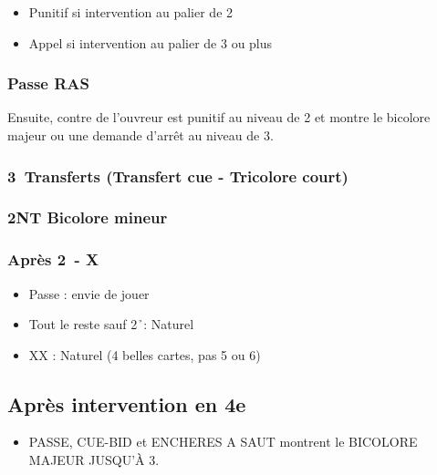\documentclass[a4paper]{article}
\begin{document}
\begin{itemize}
\item Punitif si intervention au palier de 2

\item Appel si intervention au palier de 3 ou plus

\end{itemize}

\subsubsection{Passe RAS}

Ensuite, contre de l'ouvreur est punitif au niveau de 2 et montre le bicolore majeur ou une demande d'arrêt au niveau de 3.

\subsubsection{3\pdfc\pdfd\pdfh\pdfs\ Transferts (Transfert cue - Tricolore court)}

\subsubsection{2NT Bicolore mineur}

\subsubsection{Après 2\pdfd\ - X}

\begin{itemize}
\item Passe : envie de jouer

\item Tout le reste sauf 2\h\ : Naturel

\item XX : Naturel (4 belles cartes, pas 5 ou 6)

\end{itemize}

\subsection{Après intervention en 4e}

\begin{itemize}
\item PASSE, CUE-BID et ENCHERES A SAUT montrent le BICOLORE MAJEUR JUSQU’À 3\s .

\end{itemize}
\end{document}
